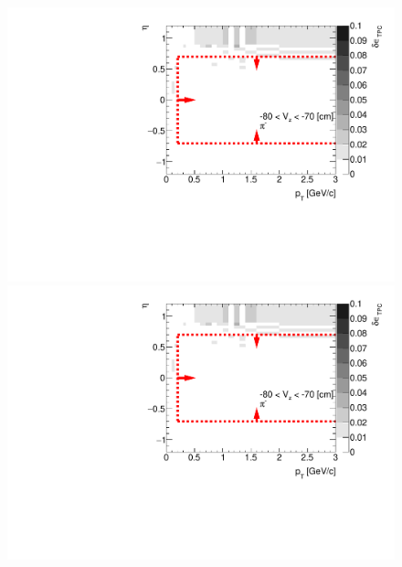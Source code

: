 \begin{figure}[hb]
{  \includegraphics[width=\linewidth,page=14]{graphics/systematicsEfficiency/deadMaterial/secondaries_Unbinned_SDCD_.pdf}\\
  \includegraphics[width=\linewidth,page=16]{graphics/systematicsEfficiency/deadMaterial/secondaries_Unbinned_SDCD_.pdf}
}%
\end{figure}

